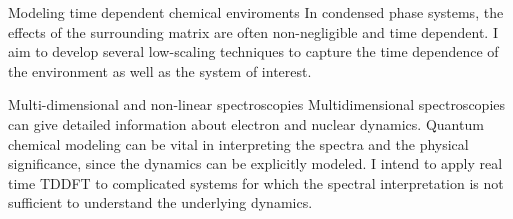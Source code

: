 


\begin{cventries}


\cventry
{} %
{Modeling time dependent chemical enviroments} %
{\vspace{-3mm}} %
{\vspace{-3mm}} %
{ %
		\qquad In condensed phase systems, the effects of the surrounding matrix are often non-negligible and time dependent. I aim to develop several low-scaling techniques to capture the time dependence of the environment as well as the system of interest.
}



\cventry
{} %
{Multi-dimensional and non-linear spectroscopies} %
{} %
{\vspace{-3mm}} %
{ \qquad Multidimensional spectroscopies can give detailed information about electron and nuclear dynamics. Quantum chemical modeling can be vital in interpreting the spectra and the physical significance, since the dynamics can be explicitly modeled. I intend to apply real time TDDFT to complicated systems for which the spectral interpretation is not sufficient to understand the underlying dynamics.} %



\end{cventries}
